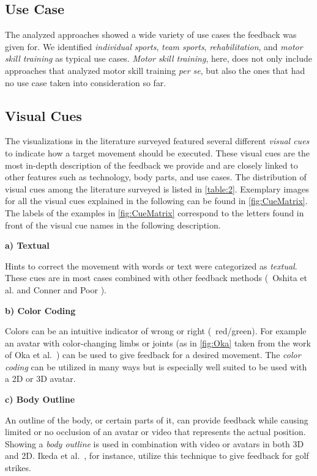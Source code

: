 \subsection*{Use Case}
The analyzed approaches showed a wide variety of use cases the feedback was given for. We identified \textit{individual sports}, \textit{team sports}, \textit{rehabilitation}, and \textit{motor skill training} as typical use cases. \textit{Motor skill training}, here, does not only include approaches that analyzed motor skill training \emph{per se}, but also the ones that had no use case taken into consideration so far.


\subsection*{Visual Cues \label{sec:visualCues}}
The visualizations in the literature surveyed featured several different \textit{visual cues} to indicate how a target movement should be executed. These visual cues are the most in-depth description of the feedback we provide and are closely linked to other features such as technology, body parts, and use cases. The distribution of visual cues among the literature surveyed is listed in \autoref{table:2}. Exemplary images for all the visual cues explained in the following can be found in \autoref{fig:CueMatrix}. The labels of the examples in  \autoref{fig:CueMatrix} correspond to the letters found in front of the visual cue names in the following description.

\textbf{a) Textual}

Hints to correct the movement with words or text were categorized as \textit{textual}. These cues are in most cases combined with other feedback methods (\eg\ Oshita et al. \cite{oshita2018sts} and Conner and Poor \cite{conner2016cef}).

\textbf{b) Color Coding}

Colors can be an intuitive indicator of wrong or right (\eg\ red/green). For example an avatar with color-changing limbs or joints (as in \autoref{fig:Oka} taken from the work of Oka et al.~\cite{oka2021rtf}) can be used to give feedback for a desired movement. The \textit{color coding} can be utilized in many ways but is especially well suited to be used with a 2D or 3D avatar.

\textbf{c) Body Outline}

An outline of the body, or certain parts of it, can provide feedback while causing limited or no occlusion of an avatar or video that represents the actual position. Showing a \textit{body outline} is used in combination with video or avatars in both 3D and 2D. Ikeda et al.~\cite{ikeda2019rtp}, for instance, utilize this technique to give feedback for golf strikes.

